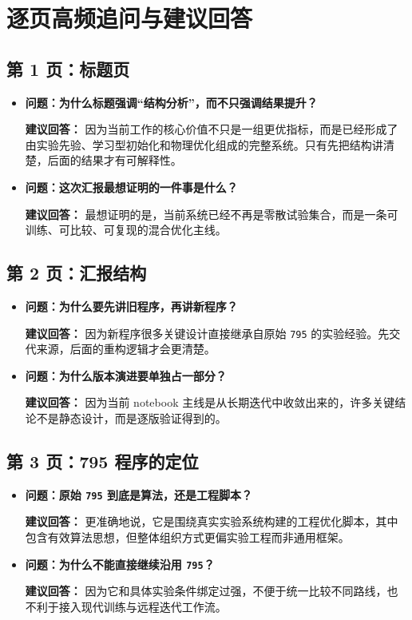 \documentclass[12pt,a4paper]{ctexart}
\begin{document}
\section{逐页高频追问与建议回答}

\subsection{第 1 页：标题页}
\begin{itemize}
\item \textbf{问题：为什么标题强调“结构分析”，而不只强调结果提升？}

\textbf{建议回答：} 因为当前工作的核心价值不只是一组更优指标，而是已经形成了由实验先验、学习型初始化和物理优化组成的完整系统。只有先把结构讲清楚，后面的结果才有可解释性。

\item \textbf{问题：这次汇报最想证明的一件事是什么？}

\textbf{建议回答：} 最想证明的是，当前系统已经不再是零散试验集合，而是一条可训练、可比较、可复现的混合优化主线。
\end{itemize}

\subsection{第 2 页：汇报结构}
\begin{itemize}
\item \textbf{问题：为什么要先讲旧程序，再讲新程序？}

\textbf{建议回答：} 因为新程序很多关键设计直接继承自原始 \texttt{795} 的实验经验。先交代来源，后面的重构逻辑才会更清楚。

\item \textbf{问题：为什么版本演进要单独占一部分？}

\textbf{建议回答：} 因为当前 notebook 主线是从长期迭代中收敛出来的，许多关键结论不是静态设计，而是逐版验证得到的。
\end{itemize}

\subsection{第 3 页：795 程序的定位}
\begin{itemize}
\item \textbf{问题：原始 \texttt{795} 到底是算法，还是工程脚本？}

\textbf{建议回答：} 更准确地说，它是围绕真实实验系统构建的工程优化脚本，其中包含有效算法思想，但整体组织方式更偏实验工程而非通用框架。

\item \textbf{问题：为什么不能直接继续沿用 \texttt{795}？}

\textbf{建议回答：} 因为它和具体实验条件绑定过强，不便于统一比较不同路线，也不利于接入现代训练与远程迭代工作流。
\end{itemize}
\end{document}
